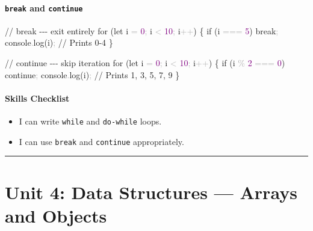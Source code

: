 \documentclass[
  justified,
  openright,
]{tufte-book}
\let\subsubsection\paragraph
\let\paragraph\paragraph
\newcommand{\BuiltInTok}[1]{#1}
\newcommand{\CommentTok}[1]{\textcolor{MidGray}{#1}}
\newcommand{\ControlFlowTok}[1]{\textcolor{BrandBlue}{#1}}
\newcommand{\DecValTok}[1]{\textcolor{Purple}{#1}}
\newcommand{\FunctionTok}[1]{\textcolor{BrandBlue}{#1}}
\newcommand{\KeywordTok}[1]{\textcolor{BrandBlue}{#1}}
\newcommand{\NormalTok}[1]{#1}
\newcommand{\OperatorTok}[1]{\textcolor{DarkGray}{#1}}
\newenvironment{Shaded}{%
  \begin{snugshade}
}{%
  \end{snugshade}
}
\let\subsubsection\paragraph
\let\paragraph\paragraph
\providecommand{\tightlist}{%
  \setlength{\itemsep}{0pt}\setlength{\parskip}{0pt}}
\begin{document}
\subsubsection{\texorpdfstring{\texttt{break} and
\texttt{continue}}{break and continue}}\label{break-and-continue}

\begin{Shaded}
\begin{Highlighting}[]
\CommentTok{// break {-}{-}{-} exit entirely}
\ControlFlowTok{for}\NormalTok{ (}\KeywordTok{let}\NormalTok{ i }\OperatorTok{=} \DecValTok{0}\OperatorTok{;}\NormalTok{ i }\OperatorTok{\textless{}} \DecValTok{10}\OperatorTok{;}\NormalTok{ i}\OperatorTok{++}\NormalTok{) \{}
  \ControlFlowTok{if}\NormalTok{ (i }\OperatorTok{===} \DecValTok{5}\NormalTok{) }\ControlFlowTok{break}\OperatorTok{;}
  \BuiltInTok{console}\OperatorTok{.}\FunctionTok{log}\NormalTok{(i)}\OperatorTok{;} \CommentTok{// Prints 0{-}4}
\NormalTok{\}}

\CommentTok{// continue {-}{-}{-} skip iteration}
\ControlFlowTok{for}\NormalTok{ (}\KeywordTok{let}\NormalTok{ i }\OperatorTok{=} \DecValTok{0}\OperatorTok{;}\NormalTok{ i }\OperatorTok{\textless{}} \DecValTok{10}\OperatorTok{;}\NormalTok{ i}\OperatorTok{++}\NormalTok{) \{}
  \ControlFlowTok{if}\NormalTok{ (i }\OperatorTok{\%} \DecValTok{2} \OperatorTok{===} \DecValTok{0}\NormalTok{) }\ControlFlowTok{continue}\OperatorTok{;}
  \BuiltInTok{console}\OperatorTok{.}\FunctionTok{log}\NormalTok{(i)}\OperatorTok{;} \CommentTok{// Prints 1, 3, 5, 7, 9}
\NormalTok{\}}
\end{Highlighting}
\end{Shaded}

\subsubsection{Skills Checklist}\label{skills-checklist-7}

\begin{itemize}
\tightlist
\item[$\square$]
  I can write \texttt{while} and \texttt{do-while} loops.
\item[$\square$]
  I can use \texttt{break} and \texttt{continue} appropriately.
\end{itemize}

\begin{center}\rule{0.5\linewidth}{0.5pt}\end{center}

\section{Unit 4: Data Structures --- Arrays and
Objects}\label{unit-4-data-structures-arrays-and-objects}
\end{document}

